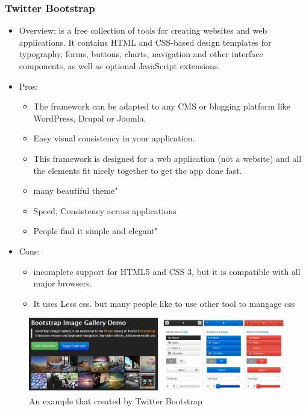 \documentclass[14pt,a4paper]{extreport}
\begin{document}
		\subsubsection{Twitter Bootstrap}
			\begin{itemize}
				\item Overview:  is a free collection of tools for creating websites and web applications. It contains HTML and CSS-based design templates for typography, forms, buttons, charts, navigation and other interface components, as well as optional JavaScript extensions.
				\item Pros: 
					\begin{itemize}
						\item The framework can be adapted to any CMS or blogging platform like WordPress, Drupal or Joomla.
						\item  Easy visual consistency in your application.
						\item This framework is designed for a web application (not a website) and all the elements fit nicely together to get the app done fast.
						\item many beautiful theme"
						\item Speed, Consistency across applications
						\item People find it simple and elegant"
					\end{itemize}
				\item Cons:
					\begin{itemize}
						\item  incomplete support for HTML5 and CSS 3, but it is compatible with all major browsers.
						\item It uses Less css. but many people like to use other tool to mangage css
					
					\end{itemize}
			\end{itemize}
			\begin{figure}
				\begin{center}
				\includegraphics[scale=0.7]{twitter.png}
				\caption{An example that created by Twitter Bootstrap}
				\end{center}				
			\end{figure}
\end{document}
